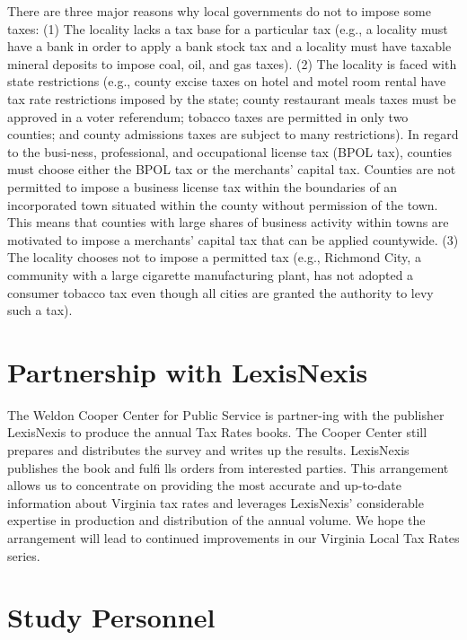 \documentclass[
]{book}
\begin{document}
There are three major reasons why local governments do not to impose some taxes: (1) The locality lacks a tax base for a particular tax (e.g., a locality must have a bank in order to apply a bank stock tax and a locality must have taxable mineral deposits to impose coal, oil, and gas taxes). (2) The locality is faced with state restrictions (e.g., county excise taxes on hotel and motel room rental have tax rate restrictions imposed by the state; county restaurant meals taxes must be approved in a voter referendum; tobacco taxes are permitted in only two counties; and county admissions taxes are subject to many restrictions). In regard to the busi-ness, professional, and occupational license tax (BPOL tax), counties must choose either the BPOL tax or the merchants' capital tax. Counties are not permitted to impose a business license tax within the boundaries of an incorporated town situated within the county without permission of the town. This means that counties with large shares of business activity within towns are motivated to impose a merchants' capital tax that can be applied countywide. (3) The locality chooses not to impose a permitted tax (e.g., Richmond City, a community with a large cigarette manufacturing plant, has not adopted a consumer tobacco tax even though all cities are granted the authority to levy such a tax).

\hypertarget{partnership-with-lexisnexis}{%
\section{Partnership with LexisNexis}\label{partnership-with-lexisnexis}}

The Weldon Cooper Center for Public Service is partner-ing with the publisher LexisNexis to produce the annual Tax Rates books. The Cooper Center still prepares and distributes the survey and writes up the results. LexisNexis publishes the book and fulfi lls orders from interested parties. This arrangement allows us to concentrate on providing the most accurate and up-to-date information about Virginia tax rates and leverages LexisNexis' considerable expertise in production and distribution of the annual volume. We hope the arrangement will lead to continued improvements in our Virginia Local Tax Rates series.

\hypertarget{study-personnel}{%
\section{Study Personnel}\label{study-personnel}}
\end{document}
